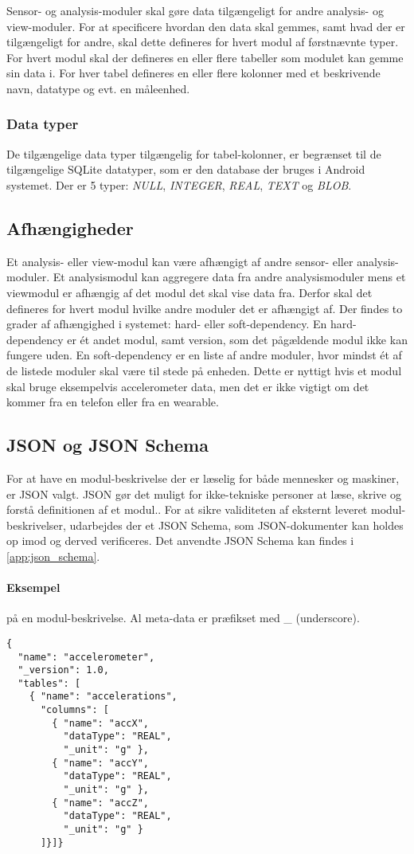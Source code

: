 Sensor- og analysis-moduler skal gøre data tilgængeligt for andre analysis- og view-moduler.
For at specificere hvordan den data skal gemmes, samt hvad der er tilgængeligt for andre, skal dette defineres for hvert modul af førstnævnte typer.
For hvert modul skal der defineres en eller flere tabeller som modulet kan gemme sin data i.
For hver tabel defineres en eller flere kolonner med et beskrivende navn, datatype og evt. en måleenhed.

\subsubsection{Data typer}
De tilgængelige data typer tilgængelig for tabel-kolonner, er begrænset til de tilgængelige SQLite datatyper, som er den database der bruges i Android systemet.
Der er 5 typer: \textit{NULL}, \textit{INTEGER}, \textit{REAL}, \textit{TEXT} og \textit{BLOB}.

\subsection{Afhængigheder}
Et analysis- eller view-modul kan være afhængigt af andre sensor- eller analysis-moduler.
Et analysismodul kan aggregere data fra andre analysismoduler mens et viewmodul er afhængig af det modul det skal vise data fra.
Derfor skal det defineres for hvert modul hvilke andre moduler det er afhængigt af.
Der findes to grader af afhængighed i systemet: hard- eller soft-dependency.
En hard-dependency er ét andet modul, samt version, som det pågældende modul ikke kan fungere uden.
En soft-dependency er en liste af andre moduler, hvor mindst ét af de listede moduler skal være til stede på enheden.
Dette er nyttigt hvis et modul skal bruge eksempelvis accelerometer data, men det er ikke vigtigt om det kommer fra en telefon eller fra en wearable.

\subsection{JSON og JSON Schema}
For at have en modul-beskrivelse der er læselig for både mennesker og maskiner, er JSON valgt.
JSON gør det muligt for ikke-tekniske personer at læse, skrive og forstå definitionen af et modul..
For at sikre validiteten af eksternt leveret modul-beskrivelser, udarbejdes der et JSON Schema, som JSON-dokumenter kan holdes op imod og derved verificeres.
Det anvendte JSON Schema kan findes i \cref{app:json_schema}.

\paragraph{Eksempel} på en modul-beskrivelse.
Al meta-data er præfikset med \_ (underscore).
\begin{lstlisting}
{
  "name": "accelerometer",
  "_version": 1.0,
  "tables": [
    { "name": "accelerations",
      "columns": [
        { "name": "accX",
          "dataType": "REAL",
          "_unit": "g" },
        { "name": "accY",
          "dataType": "REAL",
          "_unit": "g" },
        { "name": "accZ",
          "dataType": "REAL",
          "_unit": "g" }
      ]}]}
\end{lstlisting}

